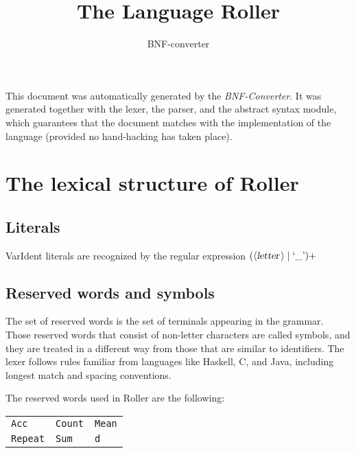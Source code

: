 \documentclass[a4paper,11pt]{article}
\author{BNF-converter}
\title{The Language Roller}
\begin{document}
\maketitle

\newcommand{\emptyP}{\mbox{$\epsilon$}}
\newcommand{\terminal}[1]{\mbox{{\texttt {#1}}}}
\newcommand{\nonterminal}[1]{\mbox{$\langle \mbox{{\sl #1 }} \! \rangle$}}
\newcommand{\arrow}{\mbox{::=}}
\newcommand{\delimit}{\mbox{$|$}}
\newcommand{\reserved}[1]{\mbox{{\texttt {#1}}}}
\newcommand{\literal}[1]{\mbox{{\texttt {#1}}}}
\newcommand{\symb}[1]{\mbox{{\texttt {#1}}}}

This document was automatically generated by the {\em BNF-Converter}. It was generated together with the lexer, the parser, and the abstract syntax module, which guarantees that the document matches with the implementation of the language (provided no hand-hacking has taken place).

\section*{The lexical structure of Roller}

\subsection*{Literals}




VarIdent literals are recognized by the regular expression
\(({\nonterminal{letter}} \mid \mbox{`\_'})+\)


\subsection*{Reserved words and symbols}
The set of reserved words is the set of terminals appearing in the grammar. Those reserved words that consist of non-letter characters are called symbols, and they are treated in a different way from those that are similar to identifiers. The lexer follows rules familiar from languages like Haskell, C, and Java, including longest match and spacing conventions.

The reserved words used in Roller are the following: \\

\begin{tabular}{lll}
{\reserved{Acc}} &{\reserved{Count}} &{\reserved{Mean}} \\
{\reserved{Repeat}} &{\reserved{Sum}} &{\reserved{d}} \\
\end{tabular}\\
\end{document}
